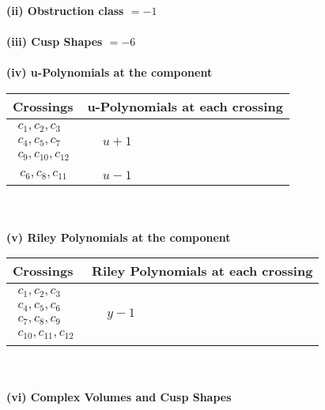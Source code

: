 \documentclass[1p]{elsarticle_modified}
\theoremstyle{definition}
\begin{document}
\flushleft \textbf{(ii) Obstruction class $= -1$}\\~\\
\flushleft \textbf{(iii) Cusp Shapes $= -6$}\\~\\
\newpage\renewcommand{\arraystretch}{1}
\flushleft \textbf{(iv) u-Polynomials at the component}\newline \\
\begin{tabular}{m{50pt}|m{274pt}}
Crossings & \hspace{64pt}u-Polynomials at each crossing \\
\hline $$\begin{aligned}c_{1},c_{2},c_{3}\\c_{4},c_{5},c_{7}\\c_{9},c_{10},c_{12}\end{aligned}$$&$\begin{aligned}
&u+1
\end{aligned}$\\
\hline $$\begin{aligned}c_{6},c_{8},c_{11}\end{aligned}$$&$\begin{aligned}
&u-1
\end{aligned}$\\
\hline
\end{tabular}\\~\\
\newpage\renewcommand{\arraystretch}{1}
\flushleft \textbf{(v) Riley Polynomials at the component}\newline \\
\begin{tabular}{m{50pt}|m{274pt}}
Crossings & \hspace{64pt}Riley Polynomials at each crossing \\
\hline $$\begin{aligned}c_{1},c_{2},c_{3}\\c_{4},c_{5},c_{6}\\c_{7},c_{8},c_{9}\\c_{10},c_{11},c_{12}\end{aligned}$$&$\begin{aligned}
&y-1
\end{aligned}$\\
\hline
\end{tabular}\\~\\
\newpage\flushleft \textbf{(vi) Complex Volumes and Cusp Shapes}
\end{document}
